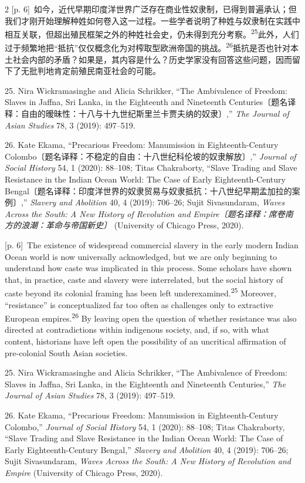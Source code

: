 \documentclass[10pt,a4paper]{article}
\begin{document}
\begin{paracol}{2}
{\scriptsize\color{gray} [p. 6]}\ 如今，近代早期印度洋世界广泛存在商业性奴隶制，已得到普遍承认；但我们才刚开始理解种姓如何卷入这一过程。一些学者说明了种姓与奴隶制在实践中相互关联，但超出殖民框架之外的种姓社会史，仍未得到充分考\mbox{察。\textsuperscript{25}}此外，人们过于频繁地把“抵抗”仅仅概念化为对榨取型欧洲帝国的挑\mbox{战。\textsuperscript{26}}抵抗是否也针对本土社会内部的矛盾？如果是，其内容是什么？历史学家没有回答这些问题，因而留下了无批判地肯定前殖民南亚社会的可能。\par{\small 25. Nira Wickramasinghe and Alicia Schrikker, “The Ambivalence of Freedom: Slaves in Jaffna, Sri Lanka, in the Eighteenth and Nineteenth Centuries〔题名译释：自由的暧昧性：十八与十九世纪斯里兰卡贾夫纳的奴隶〕,” \textit{The Journal of Asian Studies} 78, 3 (2019): 497–519.\par}{\small 26. Kate Ekama, “Precarious Freedom: Manumission in Eighteenth-Century Colombo〔题名译释：不稳定的自由：十八世纪科伦坡的奴隶解放〕,” \textit{Journal of Social History} 54, 1 (2020): 88–108; Titas Chakraborty, “Slave Trading and Slave Resistance in the Indian Ocean World: The Case of Early Eighteenth-Century Bengal〔题名译释：印度洋世界的奴隶贸易与奴隶抵抗：十八世纪早期孟加拉的案例〕,” \textit{Slavery and Abolition} 40, 4 (2019): 706–26; Sujit Sivasundaram, \textit{Waves Across the South: A New History of Revolution and Empire〔题名译释：席卷南方的浪潮：革命与帝国新史〕} (University of Chicago Press, 2020).\par}
\switchcolumn
{\scriptsize\color{gray} [p. 6]}\ The existence of widespread commercial slavery in the early modern Indian Ocean world is now universally acknowledged, but we are only beginning to understand how caste was implicated in this process. Some scholars have shown that, in practice, caste and slavery were interrelated, but the social history of caste beyond its colonial framing has been left underexamined.\nobreak\textsuperscript{25} Moreover, “resistance” is conceptualized far too often as challenges only to extractive European empires.\nobreak\textsuperscript{26} By leaving open the question of whether resistance was also directed at contradictions within indigenous society, and, if so, with what content, historians have left open the possibility of an uncritical affirmation of pre-colonial South Asian societies.\par{\small 25. Nira Wickramasinghe and Alicia Schrikker, “The Ambivalence of Freedom: Slaves in Jaffna, Sri Lanka, in the Eighteenth and Nineteenth Centuries,” \textit{The Journal of Asian Studies} 78, 3 (2019): 497–519.\par}{\small 26. Kate Ekama, “Precarious Freedom: Manumission in Eighteenth-Century Colombo,” \textit{Journal of Social History} 54, 1 (2020): 88–108; Titas Chakraborty, “Slave Trading and Slave Resistance in the Indian Ocean World: The Case of Early Eighteenth-Century Bengal,” \textit{Slavery and Abolition} 40, 4 (2019): 706–26; Sujit Sivasundaram, \textit{Waves Across the South: A New History of Revolution and Empire} (University of Chicago Press, 2020).\par}

\end{paracol}
\end{document}
